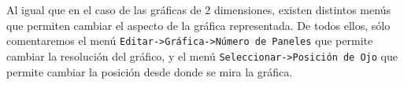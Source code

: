Al igual que en el caso de las gráficas de 2 dimensiones, existen
distintos menús que permiten cambiar el aspecto de la gráfica
representada. De todos ellos, sólo comentaremos el menú
\texttt{Editar->Gráfica->Número de Paneles} que permite cambiar la
resolución del gráfico, y el menú \texttt{Seleccionar->Posición de
Ojo} que permite cambiar la posición desde donde se mira la gráfica.

